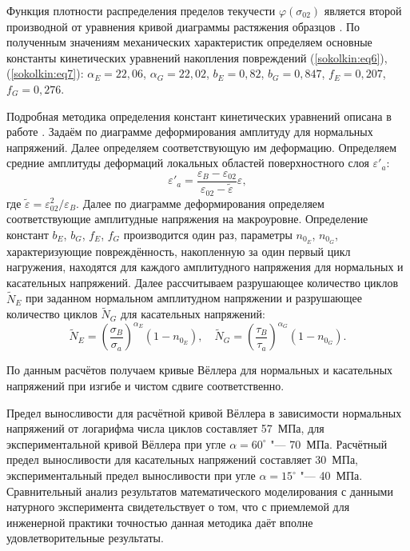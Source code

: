 Функция плотности распределения пределов текучести $\varphi (\sigma_{02})$
является второй производной от уравнения кривой диаграммы растяжения
образцов \cite{sokolkin:bib3}. По полученным значениям механических характеристик определяем
основные константы кинетических уравнений накопления повреждений (\ref{sokolkin:eq6}), (\ref{sokolkin:eq7}):
$\alpha_E= 22,06$, $\alpha_G=22,02$, $b_E=0,82$, $b_G=0,847$, $f_E=0,207$, $f_G=0,276$.

Подробная методика определения констант кинетических уравнений описана в
работе \cite{sokolkin:bib3}. Задаём по диаграмме деформирования амплитуду для нормальных
напряжений. Далее определяем соответствующую им деформацию. 
Определяем средние амплитуды деформаций локальных областей поверхностного слоя $\varepsilon'_a$:
\begin{equation*}
\varepsilon'_a =\frac{\varepsilon_B - \varepsilon _{02} }{\varepsilon_{02} -\tilde {\varepsilon }}\varepsilon,
\end{equation*}
где $\tilde {\varepsilon}={\varepsilon_{02}^2}/{\varepsilon _B}$.
Далее по диаграмме деформирования определяем соответствующие амплитудные
напряжения на макроуровне. 
Определение констант $b_E$, $b_{G}$, $f_E $, $f_{G}$ производится один раз, параметры $n_{0_E}$, $n_{0_G}$, характеризующие
повреждённость, накопленную за один первый цикл нагружения, находятся для
каждого амплитудного напряжения для нормальных и касательных напряжений.
Далее рассчитываем разрушающее количество циклов $\tilde
{N}_E$ при заданном нормальном амплитудном напряжении \cite{sokolkin:bib3} и 
разрушающее количество циклов $\tilde {N}_G $ для касательных напряжений:
\begin{equation*}
\tilde {N}_E =\left( \frac{\sigma _B }{\sigma _a } \right)^{\alpha _E
}\left( 1-n_{0_E} \right),
\quad
\tilde {N}_G =\left( \frac{\tau _B }{\tau _a} \right)^{\alpha _G }
\left( 1-n_{0_G} \right).
\end{equation*}

По данным расчётов получаем кривые Вёллера для нормальных и касательных
напряжений при изгибе и чистом сдвиге соответственно.

\smallskip

Предел выносливости для расчётной кривой Вёллера в зависимости  нормальных напряжений от
логарифма числа циклов составляет 57~МПа, для экспериментальной кривой Вёллера при угле $\alpha = 60^\circ$ "--- 70~МПа.
Расчётный предел выносливости для касательных напряжений составляет 30~МПа,
экспериментальный предел выносливости при угле $\alpha  = 15^\circ$ "--- 40~МПа.
Сравнительный анализ результатов математического моделирования с данными натурного эксперимента свидетельствует о том,
что с приемлемой для инженерной практики точностью данная методика даёт вполне удовлетворительные результаты.

